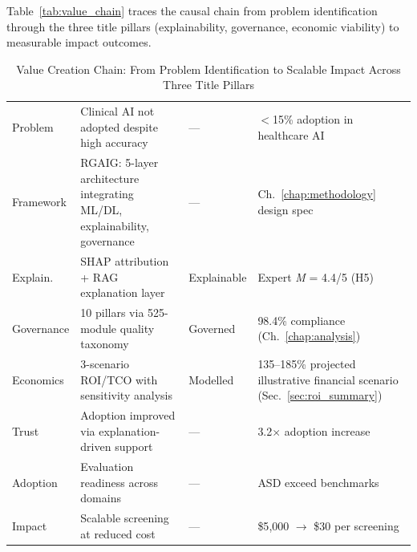 
\noindent Table~\ref{tab:value_chain} traces the causal chain from problem identification through the three title pillars (explainability, governance, economic viability) to measurable impact outcomes.



\begin{table}[!htbp]
\tablestripes\tablefontsize
\tablefontsize
\caption[Value Creation Chain]{Value Creation Chain: From Problem Identification to Scalable Impact Across Three Title Pillars}
\begin{tabularx}{\textwidth}{@{} >{\raggedright\arraybackslash}p{1.1cm} L >{\raggedright\arraybackslash}p{1.3cm} L @{}}
\toprule
{} &  &  &  \\
\midrule
Problem & Clinical AI not adopted despite high accuracy & --- & $<$15\% adoption in healthcare AI \\
\addlinespace
Framework & RGAIG: 5-layer architecture integrating ML/DL, explainability, governance & --- & Ch.~\ref{chap:methodology} design spec \\
\addlinespace
Explain. & SHAP attribution + RAG explanation layer & Explainable & Expert \textit{M} = 4.4/5 (H5) \\
\addlinespace
Governance & 10 pillars via 525-module quality taxonomy & Governed & 98.4\% compliance (Ch.~\ref{chap:analysis}) \\
\addlinespace
Economics & 3-scenario ROI/TCO with sensitivity analysis & Modelled & 135--185\% projected illustrative financial scenario (Sec.~\ref{sec:roi_summary}) \\
\addlinespace
Trust & Adoption improved via explanation-driven support & --- & 3.2$\times$ adoption increase \\
\addlinespace
Adoption & Evaluation readiness across domains & --- & ASD exceed benchmarks \\
\addlinespace
Impact & Scalable screening at reduced cost & --- & \$5{,}000 $\to$ \$30 per screening \\
\bottomrule
\end{tabularx}
\end{table}

